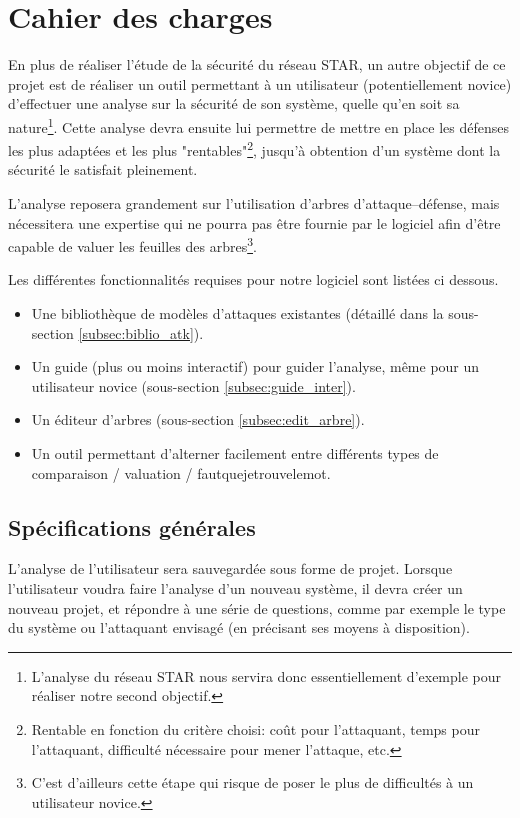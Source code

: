 \section{Cahier des charges}


    En plus de réaliser l'étude de la sécurité du réseau STAR, un autre objectif de ce projet est de réaliser un outil permettant à un utilisateur (potentiellement novice) d'effectuer une analyse sur la sécurité de son système, quelle qu'en soit sa nature\footnote{L'analyse du réseau STAR nous servira donc essentiellement d'exemple pour réaliser notre second objectif.}. Cette analyse devra ensuite lui permettre de mettre en place les défenses les plus adaptées et les plus "rentables"\footnote{Rentable en fonction du critère choisi: coût pour l'attaquant, temps pour l'attaquant, difficulté nécessaire pour mener l'attaque, etc.}, jusqu'à obtention d'un système dont la sécurité le satisfait pleinement.
    
    L'analyse reposera grandement sur l'utilisation d'arbres d'attaque--défense, mais nécessitera une expertise qui ne pourra pas être fournie par le logiciel afin d'être capable de valuer les feuilles des arbres\footnote{C'est d'ailleurs cette étape qui risque de poser le plus de difficultés à un utilisateur novice.}.
    
    Les différentes fonctionnalités requises pour notre logiciel sont listées ci dessous.
    \begin{itemize}
        \item Une bibliothèque de modèles d'attaques existantes (détaillé dans la sous-section \ref{subsec:biblio_atk}).
        \item Un guide (plus ou moins interactif) pour guider l'analyse, même pour un utilisateur novice (sous-section \ref{subsec:guide_inter}). %
        \item Un éditeur d'arbres (sous-section \ref{subsec:edit_arbre}).
        \item Un outil permettant d'alterner facilement entre différents types de comparaison / valuation / fautquejetrouvelemot.
    \end{itemize}

    \subsection{Spécifications générales}
        \label{subsec:spec_gen}
        L'analyse de l'utilisateur sera sauvegardée sous forme de projet. Lorsque l'utilisateur voudra faire l'analyse d'un nouveau système, il devra créer un nouveau projet, et répondre à une série de questions, comme par exemple le type du système ou l'attaquant envisagé (en précisant ses moyens à disposition).
        
